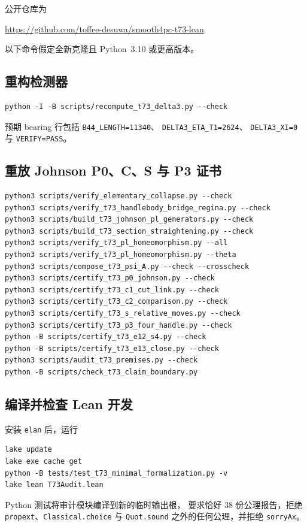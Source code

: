 公开仓库为
\begin{center}
\url{https://github.com/toffee-desuwa/smooth4pc-t73-lean}.
\end{center}
以下命令假定全新克隆且 Python~3.10 或更高版本。

\subsection{重构检测器}

\begin{verbatim}
python -I -B scripts/recompute_t73_delta3.py --check
\end{verbatim}
预期 bearing 行包括
\texttt{B44\_LENGTH=11340}、
\texttt{DELTA3\_ETA\_T1=2624}、
\texttt{DELTA3\_XI=0} 与 \texttt{VERIFY=PASS}。

\subsection{重放 Johnson P0、C、S 与 P3 证书}

\begin{verbatim}
python3 scripts/verify_elementary_collapse.py --check
python3 scripts/verify_t73_handlebody_bridge_regina.py --check
python3 scripts/build_t73_johnson_pl_generators.py --check
python3 scripts/build_t73_section_straightening.py --check
python3 scripts/verify_t73_pl_homeomorphism.py --all
python3 scripts/verify_t73_pl_homeomorphism.py --theta
python3 scripts/compose_t73_psi_A.py --check --crosscheck
python3 scripts/certify_t73_p0_johnson.py --check
python3 scripts/certify_t73_c1_cut_link.py --check
python3 scripts/certify_t73_c2_comparison.py --check
python3 scripts/certify_t73_s_relative_moves.py --check
python3 scripts/certify_t73_p3_four_handle.py --check
python -B scripts/certify_t73_e12_s4.py --check
python -B scripts/certify_t73_e13_close.py --check
python3 scripts/audit_t73_premises.py --check
python -B scripts/check_t73_claim_boundary.py
\end{verbatim}

\subsection{编译并检查 Lean 开发}

安装 \texttt{elan} 后，运行
\begin{verbatim}
lake update
lake exe cache get
python -B tests/test_t73_minimal_formalization.py -v
lake lean T73Audit.lean
\end{verbatim}
Python 测试将审计模块编译到新的临时输出根，
要求恰好 $38$ 份公理报告，拒绝
\texttt{propext}、\texttt{Classical.choice} 与 \texttt{Quot.sound}
之外的任何公理，并拒绝 \texttt{sorryAx}。

